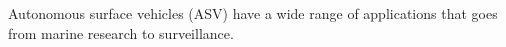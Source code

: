 Autonomous surface vehicles (ASV) have a wide range of applications that goes from marine research to surveillance. 


